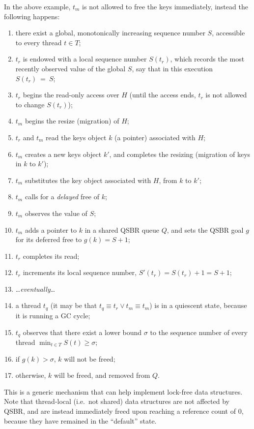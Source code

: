 In the above example, $t_m$ is not allowed to free the keys immediately, instead the following happens:
\begin{enumerate}
    \item there exist a global, monotonically increasing sequence number $S$, accessible to every thread $t \in T$;
    \item $t_r$ is endowed with a local sequence number $S(t_r)$, which records the most recently observed value of the global $S$, say that in this execution $S(t_r)~=~S$;
    \item $t_r$ begins the read-only access over $H$ (until the access ends, $t_r$ is not allowed to change $S(t_r)$);
    \item $t_m$ begins the resize (migration) of $H$;
    \item $t_r$ and $t_m$ read the keys object $k$ (a pointer) associated with $H$;
    \item $t_m$ creates a new keys object $k'$, and completes the resizing (migration of keys in $k$ to $k'$);
    \item $t_m$ substitutes the key object associated with $H$, from $k$ to $k'$;
    \item $t_m$ calls for a \emph{delayed} free of $k$;
    \item $t_m$ observes the value of $S$;
    \item $t_m$ adds a pointer to $k$ in a shared QSBR queue $Q$, and sets the QSBR goal $g$ for its deferred free to $g(k) = S + 1$;
    \item $t_r$ completes its read;
    \item $t_r$ increments its local sequence number, $S'(t_r) = S(t_r) + 1 = S + 1$;
    \item \ldots\emph{eventually}\ldots
    \item a thread $t_q$ (it may be that $t_q \equiv t_r \vee t_m \equiv t_m$) is in a quiescent state, because it is running a GC cycle;
    \item $t_q$ observes that there exist a lower bound $\sigma$ to the sequence number of every thread $\min_{t \in T} S(t) \geq \sigma$;
    \item if $g(k) > \sigma$, $k$ will not be freed;
    \item otherwise, $k$ will be freed, and removed from $Q$.
\end{enumerate}

This is a generic mechanism that can help implement lock-free data structures.
Note that thread-local (i.e.\ not shared) data structures are not affected by QSBR, and are instead immediately freed upon reaching a reference count of 0, because they have remained in the ``default'' state.


